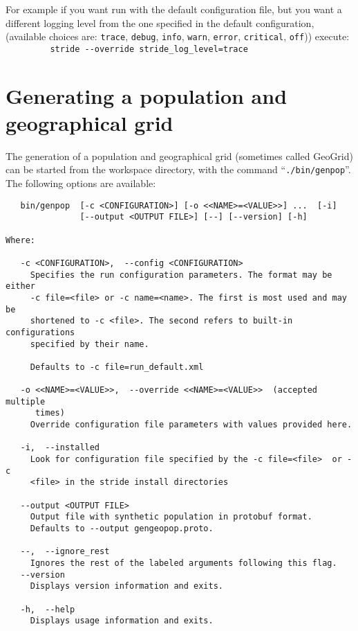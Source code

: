 For example if you want run with the default configuration file, but you
want a different logging level from the one specified in the default configuration,
(available choices are: \texttt{trace}, \texttt{debug}, \texttt{info}, \texttt{warn},
\texttt{error}, \texttt{critical}, \texttt{off})) execute:\\
\verb!         stride --override stride_log_level=trace!


\section{Generating a population and geographical grid}

 The generation of a population and geographical grid (sometimes called GeoGrid) can be started
 from the workspace directory, with the command \mbox{``\texttt{./bin/genpop}''}.
 The following options are available:
\begin{verbatim}
   bin/genpop  [-c <CONFIGURATION>] [-o <<NAME>=<VALUE>>] ...  [-i]
               [--output <OUTPUT FILE>] [--] [--version] [-h]

Where:

   -c <CONFIGURATION>,  --config <CONFIGURATION>
     Specifies the run configuration parameters. The format may be either
     -c file=<file> or -c name=<name>. The first is most used and may be
     shortened to -c <file>. The second refers to built-in configurations
     specified by their name.

     Defaults to -c file=run_default.xml

   -o <<NAME>=<VALUE>>,  --override <<NAME>=<VALUE>>  (accepted multiple
      times)
     Override configuration file parameters with values provided here.

   -i,  --installed
     Look for configuration file specified by the -c file=<file>  or -c
     <file> in the stride install directories

   --output <OUTPUT FILE>
     Output file with synthetic population in protobuf format.
     Defaults to --output gengeopop.proto.

   --,  --ignore_rest
     Ignores the rest of the labeled arguments following this flag.
   --version
     Displays version information and exits.
 
   -h,  --help
     Displays usage information and exits.
\end{verbatim}

